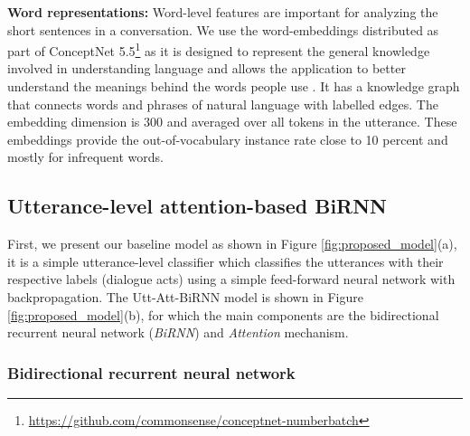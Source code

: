 \documentclass[a4paper]{article}
\begin{document}
\textbf{Word representations:} Word-level features are important for analyzing the short sentences in a conversation. We use the word-embeddings distributed as part of ConceptNet 5.5\footnote{\url{https://github.com/commonsense/conceptnet-numberbatch}} as it is designed to represent the general knowledge involved
in understanding language and allows the application to better understand
the meanings behind the words people use \cite{speer2017conceptnet}. It has a knowledge graph that connects words and phrases of natural language with labelled edges. 
The embedding dimension is 300 and averaged over all tokens in the utterance. These embeddings provide the out-of-vocabulary instance rate close to 10 percent and mostly for infrequent words.


\subsection{Utterance-level attention-based BiRNN}

First, we present our baseline model as shown in Figure \ref{fig:proposed_model}(a), it is a simple utterance-level classifier which classifies the utterances with their respective labels (dialogue acts) using a simple feed-forward neural network with backpropagation.  
The Utt-Att-BiRNN model is shown in Figure \ref{fig:proposed_model}(b), for which the main components are the bidirectional recurrent neural network (\textit{BiRNN}) and \textit{Attention} mechanism.

\subsubsection{Bidirectional recurrent neural network} 
\end{document}
